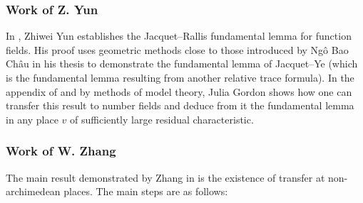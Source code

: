 \subsubsection{Work of Z. Yun}

In \cite{yun2011fundamental}, Zhiwei Yun establishes the Jacquet--Rallis fundamental lemma for function fields.
His proof uses geometric methods close to those introduced by Ngô Bao Châu in his thesis to demonstrate the fundamental lemma of Jacquet--Ye (which is the fundamental lemma resulting from another relative trace formula).
In the appendix of \cite{yun2011fundamental} and by methods of model theory, Julia Gordon shows how one can transfer this result to number fields and deduce from it the fundamental lemma in any place $v$ of sufficiently large residual characteristic.


\subsubsection{Work of W. Zhang}

The main result demonstrated by Zhang in \cite{zhang2014fourier} is the existence of transfer at non-archimedean places.
The main steps are as follows:

